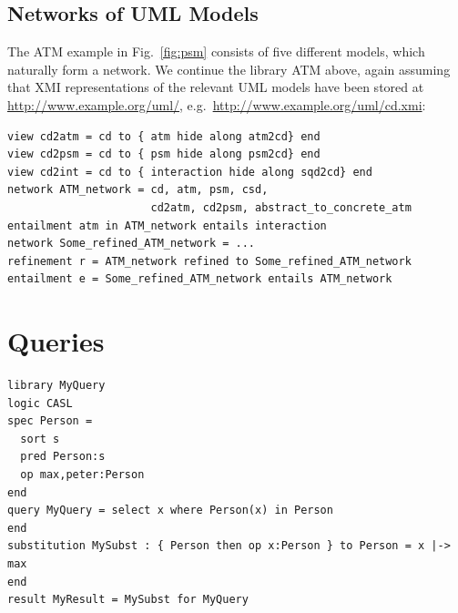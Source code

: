 \documentclass[10pt,fleqn,%
\ifpretendfinal
final%
\else
draft%
\fi,
]{scrreprt}
\newcommand{\sclause}[1]{\section{#1}}
\newcommand{\ssclause}[1]{\subsection{#1}}
\newcommand{\uml}[1]{\textsf{#1}}
\begin{document}
\ssclause{Networks of UML Models}

The ATM example in Fig.~\ref{fig:psm} consists of five different
models, which naturally form a network. We continue the library
\uml{ATM} above, again assuming that XMI representations of the
relevant UML models have been stored at
\url{http://www.example.org/uml/},
e.g.\ \url{http://www.example.org/uml/cd.xmi}:
\begin{lstlisting}[basicstyle=\ttfamily,language=dolText,morekeywords={props,ObjectProperty,Class,DisjointUnionOf,SubClassOf,Characteristics,Transitive,Asymmetric,SubPropertyOf,DisjointClasses,EquivalentTo,inverse,only,forall,iff,if,or,exists,distributed,refinement,library,via,network,entailment,entails,refined},escapechar=@,mathescape]
view cd2atm = cd to { atm hide along atm2cd} end
view cd2psm = cd to { psm hide along psm2cd} end
view cd2int = cd to { interaction hide along sqd2cd} end
network ATM_network = cd, atm, psm, csd,
                      cd2atm, cd2psm, abstract_to_concrete_atm
entailment atm in ATM_network entails interaction
network Some_refined_ATM_network = ...
refinement r = ATM_network refined to Some_refined_ATM_network
entailment e = Some_refined_ATM_network entails ATM_network
\end{lstlisting}



\sclause{Queries}
\begin{lstlisting}[basicstyle=\ttfamily,language=dolText,morekeywords={props,ObjectProperty,Class,DisjointUnionOf,SubClassOf,Characteristics,Transitive,Asymmetric,SubPropertyOf,DisjointClasses,EquivalentTo,inverse,only,forall,iff,if,or,exists,query,select,where,in,substitution,result,for,along,library,spec,sort,pred,op},escapechar=@,mathescape]
library MyQuery
logic CASL
spec Person =
  sort s
  pred Person:s 
  op max,peter:Person
end
query MyQuery = select x where Person(x) in Person
end
substitution MySubst : { Person then op x:Person } to Person = x |-> max
end
result MyResult = MySubst for MyQuery
\end{lstlisting}
\end{document}
